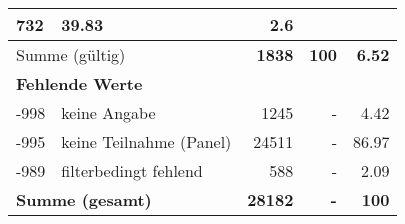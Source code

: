 \begin{longtable}{lXrrr}
       \num{732} &
       \num[round-mode=places,round-precision=2]{39.83} &
         \num[round-mode=places,round-precision=2]{2.6} \\
     \midrule
     \multicolumn{2}{l}{Summe (gültig)} &
       \textbf{\num{1838}} &
     \textbf{\num{100}} &
       \textbf{\num[round-mode=places,round-precision=2]{6.52}} \\
     \multicolumn{5}{l}{\textbf{Fehlende Werte}}\\
       -998 &
       keine Angabe &
         \num{1245} &
        - &
         \num[round-mode=places,round-precision=2]{4.42} \\
       -995 &
       keine Teilnahme (Panel) &
         \num{24511} &
        - &
         \num[round-mode=places,round-precision=2]{86.97} \\
       -989 &
       filterbedingt fehlend &
         \num{588} &
        - &
         \num[round-mode=places,round-precision=2]{2.09} \\
     \midrule
     \multicolumn{2}{l}{\textbf{Summe (gesamt)}} &
          \textbf{\num{28182}} &
        \textbf{-} &
        \textbf{\num{100}} \\
     \bottomrule
     \end{longtable}
     
